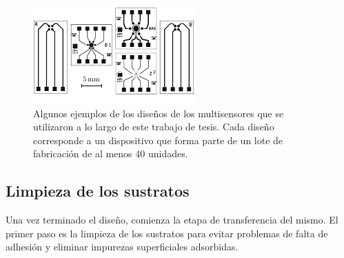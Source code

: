 			\begin{figure}[t!]
					  \begin{center}
			  		  \includegraphics[width=\textwidth]{Imagenes/disenos-capitulo2.pdf}
			  		  \vspace*{-7mm}
			  		  \caption{Algunos ejemplos de los diseños de los multisensores que se utilizaron a lo largo de este trabajo de tesis. Cada diseño corresponde a un dispositivo que forma parte de un lote de fabricación de al menos 40 unidades.}
			  		  \label{fig:mask_ejemplos}
			  		  \end{center}
			  		  \end{figure}
				
	\subsection{Limpieza de los sustratos}\label{sec:limpieza}
			
			Una vez terminado el diseño, comienza la etapa de transferencia del mismo. El primer paso es la limpieza de los sustratos para evitar problemas de falta de adhesión y eliminar impurezas superficiales adsorbidas. 

